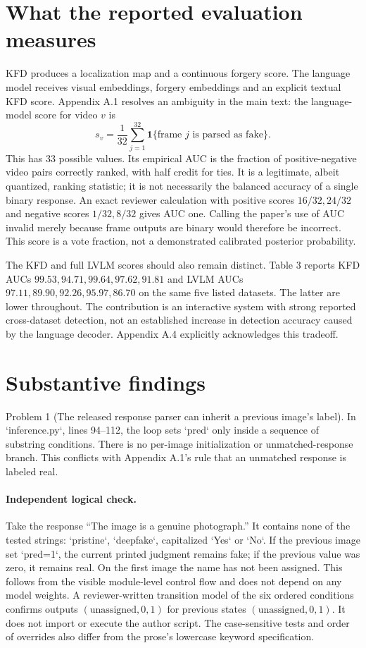 \documentclass[10pt]{article}
\begin{document}
\section*{What the reported evaluation measures}
KFD produces a localization map and a continuous forgery score. The language model receives visual embeddings, forgery embeddings and an explicit textual KFD score. Appendix A.1 resolves an ambiguity in the main text: the language-model score for video \(v\) is \[s_v=\frac1{32}\sum_{j=1}^{32}\mathbf{1}\{\text{frame }j\text{ is parsed as fake}\}.\] This has 33 possible values. Its empirical AUC is the fraction of positive-negative video pairs correctly ranked, with half credit for ties. It is a legitimate, albeit quantized, ranking statistic; it is not necessarily the balanced accuracy of a single binary response. An exact reviewer calculation with positive scores \(16/32,24/32\) and negative scores \(1/32,8/32\) gives AUC one. Calling the paper’s use of AUC invalid merely because frame outputs are binary would therefore be incorrect. This score is a vote fraction, not a demonstrated calibrated posterior probability.\par
The KFD and full LVLM scores should also remain distinct. Table 3 reports KFD AUCs \(99.53,94.71,99.64,97.62,91.81\) and LVLM AUCs \(97.11,89.90,92.26,95.97,86.70\) on the same five listed datasets. The latter are lower throughout. The contribution is an interactive system with strong reported cross-dataset detection, not an established increase in detection accuracy caused by the language decoder. Appendix A.4 explicitly acknowledges this tradeoff.\par
\section*{Substantive findings}
Problem 1 (The released response parser can inherit a previous image’s label).  In `inference.py`, lines 94–112, the loop sets `pred` only inside a sequence of substring conditions. There is no per-image initialization or unmatched-response branch. This conflicts with Appendix A.1’s rule that an unmatched response is labeled real.\par
\paragraph*{Independent logical check.}\mbox{}\par
Take the response “The image is a genuine photograph.” It contains none of the tested strings: `pristine`, `deepfake`, capitalized `Yes` or `No`. If the previous image set `pred=1`, the current printed judgment remains fake; if the previous value was zero, it remains real. On the first image the name has not been assigned. This follows from the visible module-level control flow and does not depend on any model weights. A reviewer-written transition model of the six ordered conditions confirms outputs \((\text{unassigned},0,1)\) for previous states \((\text{unassigned},0,1)\). It does not import or execute the author script. The case-sensitive tests and order of overrides also differ from the prose’s lowercase keyword specification.\par
\end{document}
